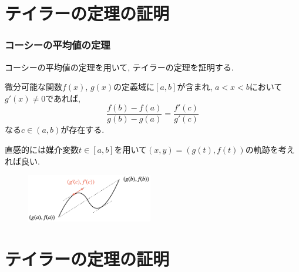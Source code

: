 

\section{テイラーの定理の証明}

\begin{frame}
\frametitle{コーシーの平均値の定理}

コーシーの平均値の定理を用いて, テイラーの定理を証明する. 

\begin{Thm}[コーシーの平均値の定理] 
微分可能な関数$f(x)$, $g(x)$の定義域に$[a,b]$が含まれ, $a<x<b$において$g'(x) \ne 0$であれば, 
$$
\frac{f(b)-f(a)}{g(b)-g(a)}=\frac{f'(c)}{g'(c)}
$$
なる$c \in (a,b)$が存在する. 
\end{Thm}

直感的には媒介変数$t \in [a,b]$を用いて$(x,y)=(g(t),f(t))$の軌跡を考えれば良い. 

\vspace{-5mm}

 \begin{figure}[htbp]
 \begin{center} 
  \includegraphics[width=55mm]{calculus9/CauchyMean.png}
 \end{center}
\end{figure}

\end{frame}






\section{テイラーの定理の証明}

